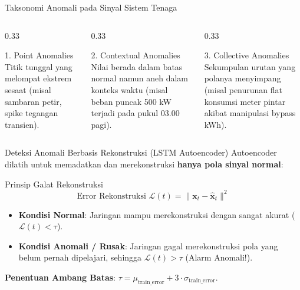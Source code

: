 \documentclass[aspectratio=169, 10pt]{beamer}
\begin{document}
\begin{frame}{Taksonomi Anomali pada Sinyal Sistem Tenaga}
    \begin{columns}[T]
        \begin{column}{0.33\textwidth}
            \begin{block}{1. Point Anomalies}
                Titik tunggal yang melompat ekstrem sesaat (misal sambaran petir, spike tegangan transien).
            \end{block}
        \end{column}
        \begin{column}{0.33\textwidth}
            \begin{block}{2. Contextual Anomalies}
                Nilai berada dalam batas normal namun aneh dalam konteks waktu (misal beban puncak 500 kW terjadi pada pukul 03.00 pagi).
            \end{block}
        \end{column}
        \begin{column}{0.33\textwidth}
            \begin{block}{3. Collective Anomalies}
                Sekumpulan urutan yang polanya menyimpang (misal penurunan flat konsumsi meter pintar akibat manipulasi bypass kWh).
            \end{block}
        \end{column}
    \end{columns}
\end{frame}

\begin{frame}{Deteksi Anomali Berbasis Rekonstruksi (LSTM Autoencoder)}
    Autoencoder dilatih untuk memadatkan dan merekonstruksi \textbf{hanya pola sinyal normal}:
    \begin{block}{Prinsip Galat Rekonstruksi}
        \begin{equation}
            \text{Error Rekonstruksi } \mathcal{L}(t) = \| \mathbf{x}_t - \hat{\mathbf{x}}_t \|^2
        \end{equation}
        \begin{itemize}
            \item \textbf{Kondisi Normal}: Jaringan mampu merekonstruksi dengan sangat akurat ($\mathcal{L}(t) < \tau$).
            \item \textbf{Kondisi Anomali / Rusak}: Jaringan gagal merekonstruksi pola yang belum pernah dipelajari, sehingga $\mathcal{L}(t) > \tau$ (Alarm Anomali!).
        \end{itemize}
    \end{block}
    \begin{center}
        \textbf{Penentuan Ambang Batas}: $\tau = \mu_{\text{train\_error}} + 3 \cdot \sigma_{\text{train\_error}}$.
    \end{center}
\end{frame}
\end{document}
